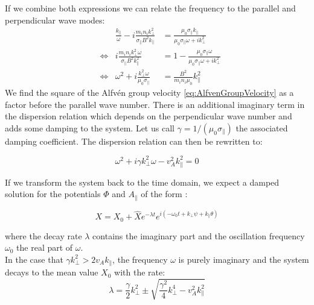 If we combine both expressions we can relate the frequency to the parallel and perpendicular wave modes:
\begin{align}
	&& \frac{k_\parallel}{\omega} - i\frac{m_in_ik_\perp^2}{\sigma_\parallel B^2k_\parallel} &= \frac{\mu_0\sigma_\parallel k_\parallel}{\mu_0\sigma_\parallel\omega + i k_\perp^2} \nonumber \\
	&\Leftrightarrow& i\frac{m_in_ik_\perp^2\omega}{\sigma_\parallel B^2k_\parallel^2} &= 1- \frac{\mu_0\sigma_\parallel\omega}{\mu_0\sigma_\parallel\omega + i k_\perp^2} \nonumber \\
	&\Leftrightarrow& \omega^2 + i\frac{k_\perp^2\omega}{\mu_0\sigma_\parallel} &= \frac{B^2}{m_in_i\mu_0}k_\parallel^2 \nonumber
\end{align}
We find the square of the Alfvén group velocity \ref{eq:AlfvenGroupVelocity} as a factor before the parallel wave number. There is an additional imaginary term in the dispersion relation which depends on the perpendicular wave number and adds some damping to the system. Let us call $\gamma = 1/(\mu_0\sigma_\parallel)$ the associated damping coefficient. The dispersion relation can then be rewritten to: 

\begin{equation}
	\omega^2+i\gamma k_\perp^2\omega-v_A^2k_\parallel^2=0 \label{eq_electromagneticSLAB_fullDispersionRelation}
\end{equation} 

If we transform the system back to the time domain, we expect a damped solution for the potentials $\Phi$ and $A_\parallel$ of the form \cite{waveDispersionRelation}:

\begin{equation}
  X = X_0 + \hat{X}e^{-\lambda t}e^{i\left(-\omega_0 t + k_\perp \psi + k_\parallel \theta\right)} \label{eq:electromagneticSLAB_underdampedSolution}
\end{equation}

where the decay rate $\lambda$ contains the imaginary part and the oscillation frequency $\omega_0$ the real part of $\omega$. \\

In the case that $\gamma k_\perp^2 > 2v_Ak_\parallel$, the frequency $\omega$ is purely imaginary and the system decays to the mean value $X_0$ with the rate:
\begin{equation}
	\lambda = \frac{\gamma}{2}k_\perp^2 \pm \sqrt{\frac{\gamma^2}{4}k_\perp^4-v_A^2k_\parallel^2} \label{eq:electromagneticSLAB_overdampedDecayRate}
\end{equation} 

